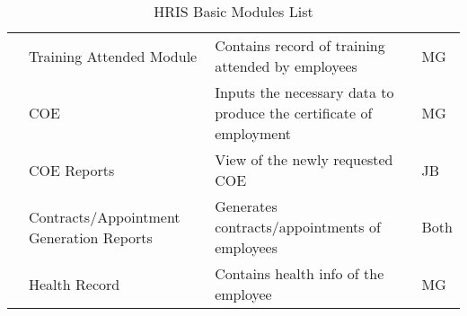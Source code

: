 \begin{table}[H]
\begin{tabularx}{\textwidth}{|p{2cm}|p{3.5cm}|X|p{1.5cm}|}
                        & Training Attended Module                 & Contains record of training attended by employees                                     & MG               \\
                        & COE                                      & Inputs the necessary data to produce the certificate of employment                    & MG               \\
                        & COE Reports                              & View of the newly requested COE                                                       & JB               \\
                        & Contracts/Appointment Generation Reports & Generates contracts/appointments of employees                                         & Both             \\
                        & Health Record                            & Contains health info of the employee                                                  & MG               \\ \bottomrule
    \end{tabularx}
    \caption{HRIS Basic Modules List}
    \label{tab:hris-basic-modules}
\end{table}

